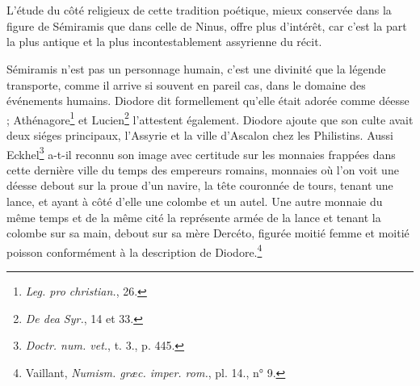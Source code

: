 \documentclass[a4paper, 11pt, oneside]{article}
\begin{document}
\bigskip
\centerline{\EightStarTaper}
\centerline{\EightStarTaper\EightStarTaper}
\bigskip
\clearpage
\section{}
\paragraph{}
L'étude du côté religieux de cette tradition poétique, mieux conservée dans la figure de Sémiramis que dans celle de Ninus, offre plus d'intérêt, car c'est la part la plus antique et la plus incontestablement assyrienne du récit.

Sémiramis n'est pas un personnage humain, c'est une divinité que la légende transporte, comme il arrive si souvent en pareil cas, dans le domaine des événements humains. Diodore dit formellement qu'elle était adorée comme déesse ; Athénagore\footnote{\emph{Leg. pro christian.}, 26.} et Lucien\footnote{\emph{De dea Syr.}, 14 et 33.} l'attestent également. Diodore ajoute que son culte avait deux siéges principaux, l'Assyrie et la ville d'Ascalon chez les Philistins. Aussi Eckhel\footnote{\emph{Doctr. num. vet.}, t. 3., p. 445.} a-t-il reconnu son image avec certitude sur les monnaies frappées dans cette dernière ville du temps des empereurs romains, monnaies où l'on voit une déesse debout sur la proue d'un navire, la tête couronnée de tours, tenant une lance, et ayant à côté d'elle une colombe et un autel. Une autre monnaie du même temps et de la même cité la représente armée de la lance et tenant la colombe sur sa main, debout sur sa mère Dercéto, figurée moitié femme et moitié poisson conformément à la description de Diodore.\footnote{Vaillant, \emph{Numism. græc. imper. rom.}, pl. 14., n° 9.}
\end{document}
